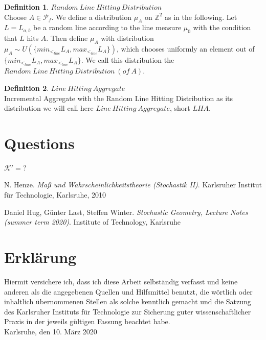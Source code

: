 \documentclass[12pt,a4paper]{scrartcl}
\numberwithin{equation}{subsection}
\numberwithin{equation}{section}
\theoremstyle{definition}
\newtheorem{definition}{Definition}[subsection]
\begin{document}
\begin{definition} $\mathit{Random\ Line\ Hitting\ Distribution}$\\
	\indent Choose $A\in \mathcal{P}_f$. We define a distribution $\mu_A$ on $\mathbb{Z}^2$ as in the following. 
	Let $L=L_{a,b}$ be a random line according to the line measure $\mu_0$ with the condition that $L$ hits $A$. Then define $\mu_A$ with distribution $\mu_A \sim U(\{min_{<_{line}}L_A, max_{<_{line}}L_A\})$, which chooses uniformly an element out of $\{min_{<_{line}}L_A, max_{<_{line}}L_A\}$. We call this distribution the $\mathit{Random\ Line\ Hitting\ Distribution\ (of\ A)}$.
\end{definition}

\begin{definition} $\mathit{Line\ Hitting\ Aggregate}$\\
	\indent Incremental Aggregate with the Random Line Hitting Distribution as its distribution we will call here $\mathit{Line\ Hitting\ Aggregate}$, short $\mathit{LHA}$. 
\end{definition}

\newpage
\section{Questions}
$\mathcal{K}'=?$

\newpage

\begin{thebibliography}{biblio}
\thispagestyle{empty}

N. Henze.
\emph{Maß und Wahrscheinlichkeitstheorie (Stochastik II)}.
Karlsruher Institut für Technologie, Karlsruhe, 2010

Daniel Hug, Günter Last, Steffen Winter.
\emph{Stochastic Geometry, 	Lecture Notes (summer term 2020)}.
Institute of Technology, Karlsruhe



\end{thebibliography}

\newpage
  
\thispagestyle{empty}

\vspace*{8cm}


\section*{Erklärung}

Hiermit versichere ich, dass ich diese Arbeit selbständig verfasst und keine anderen als die angegebenen Quellen und Hilfsmittel benutzt, die wörtlich oder inhaltlich übernommenen Stellen als solche kenntlich gemacht und die Satzung des Karlsruher Instituts für Technologie zur Sicherung guter wissenschaftlicher Praxis in der jeweils gültigen Fassung beachtet habe. \\[2ex] 

\noindent
Karlsruhe, den 10. März 2020\\[5ex] 
\end{document}
